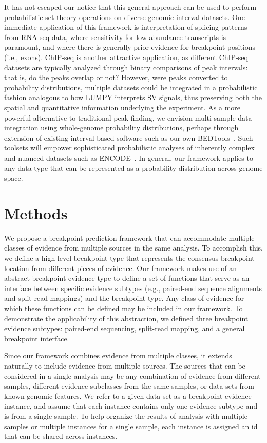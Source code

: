 \documentclass[10pt]{bmc_article}
\newenvironment{bmcformat}{\begin{raggedright}\baselineskip20pt\sloppy\setboolean{publ}{false}}{\end{raggedright}\baselineskip20pt\sloppy}
\begin{document}
\begin{bmcformat}
It has not escaped our notice that this general approach can be used to perform
probabilistic set theory operations on diverse genomic interval datasets. One
immediate application of this framework is interpretation of splicing patterns
from RNA-seq data, where sensitivity for low abundance transcripts is paramount,
and where there is generally prior evidence for breakpoint positions (i.e.,
exons). ChIP-seq is another attractive application, as different ChIP-seq
datasets are typically analyzed through binary comparisons of peak intervals:
that is, do the peaks overlap or not? However, were peaks converted to
probability distributions, multiple datasets could be integrated in a
probabilistic fashion analogous to how LUMPY interprets SV signals, thus
preserving both the spatial and quantitative information underlying the
experiment. As a more powerful alternative to traditional peak finding, we
envision multi-sample data integration using whole-genome probability
distributions, perhaps through extension of existing interval-based software
such as our own BEDTools~\cite{quinlan2010a}. Such toolsets will empower
sophisticated probabilistic analyses of inherently complex and nuanced datasets
such as ENCODE~\cite{encode2012}. In general, our framework applies to any data
type that can be represented as a probability distribution across genome space.


\section*{Methods}

We propose a breakpoint prediction framework that can accommodate multiple
classes of evidence from multiple sources in the same analysis.  To accomplish
this, we define a high-level breakpoint type that represents the consensus
breakpoint location from different pieces of evidence.  Our framework makes use
of an abstract breakpoint evidence type to define a set of functions that serve
as an interface between specific evidence subtypes (e.g., paired-end sequence
alignments and split-read mappings) and the breakpoint type.  Any class of
evidence for which these functions can be defined may be included in our
framework.  To demonstrate the applicability of this abstraction, we defined
three breakpoint evidence subtypes: paired-end sequencing, split-read mapping,
and a general breakpoint interface.

Since our framework combines evidence from multiple classes, it extends
naturally to include evidence from multiple sources.  The sources that can be
considered in a single analysis may be any combination of evidence from
different samples, different evidence subclasses from the same samples, or
data sets from known genomic features.  We refer to a given data set as a
breakpoint evidence instance, and assume that each instance contains only one
evidence subtype and is from a single sample.  To help organize the results of
analysis with multiple samples or multiple instances for a single sample,
each instance is assigned an id that can be shared across instances.



\end{bmcformat}
\end{document}
